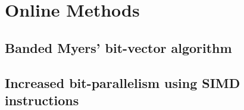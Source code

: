 
\chapter{Online Methods}
\section{Banded Myers' bit-vector algorithm}
\section{Increased bit-parallelism using SIMD instructions}
